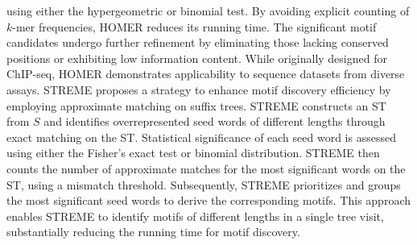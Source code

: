 \documentclass[a4paper, titlepage, openright]{book}
\begin{document}
using either the hypergeometric or binomial test. By avoiding explicit counting of $k$-mer frequencies, HOMER reduces its running time. The significant motif candidates undergo further refinement by eliminating those lacking conserved positions or exhibiting low information content. While originally designed for ChIP-seq, HOMER demonstrates applicability to sequence datasets from diverse assays. STREME \citep{bailey2021streme} proposes a strategy to enhance motif discovery efficiency by employing approximate matching on suffix trees. STREME constructs an ST from $S$ and identifies overrepresented seed words of different lengths through exact matching on the ST. Statistical significance of each seed word is assessed using either the Fisher’s exact test or binomial distribution. STREME then counts the number of approximate matches for the most significant words on the ST, using a mismatch threshold. Subsequently, STREME prioritizes and groups the most significant seed words to derive the corresponding motifs. This approach enables STREME to identify motifs of different lengths in a single tree visit, substantially reducing the running time for motif discovery.

\end{document}
